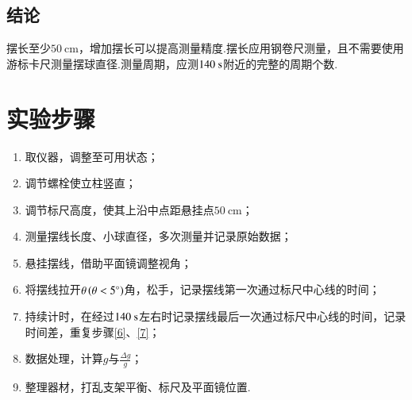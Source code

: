 \documentclass[a4paper]{article}%
\begin{document}
\subsection*{结论}
摆长至少$50~\text{cm}$，增加摆长可以提高测量精度.摆长应用钢卷尺测量，且不需要使用游标卡尺测量摆球直径.测量周期，应测$140~\text s$附近的完整的周期个数.

\section*{实验步骤}
\begin{enumerate}
    \item 取仪器，调整至可用状态；
    \item 调节螺栓使立柱竖直；
    \item 调节标尺高度，使其上沿中点距悬挂点$50~\text{cm}$；
    \item 测量摆线长度、小球直径，多次测量并记录原始数据；
    \item 悬挂摆线，借助平面镜调整视角；
    \item 将摆线拉开$\theta\left(\theta<5\degree\right)$角，松手，记录摆线第一次通过标尺中心线的时间；\label{6}
    \item 持续计时，在经过$140~\text s$左右时记录摆线最后一次通过标尺中心线的时间，记录时间差，重复步骤\ref{6}、\ref{7}；\label{7}
    \item 数据处理，计算$g$与$\frac{\Delta g}{g}$；
    \item 整理器材，打乱支架平衡、标尺及平面镜位置.
\end{enumerate}
\end{document}
